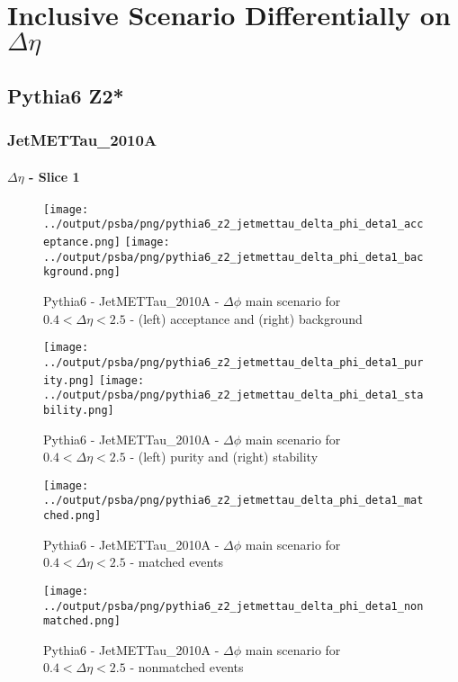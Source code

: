 \documentclass[11pt]{book}
\begin{document}
\clearpage
\chapter{Inclusive Scenario Differentially on $\Delta\eta$}
\section{Pythia6 Z2*}
\subsection{JetMETTau\_2010A}

\subsubsection{$\Delta\eta$ - Slice 1}
\begin{figure}[ht]
\centering
\texttt{[image: ../output/psba/png/pythia6\_z2\_jetmettau\_delta\_phi\_deta1\_acceptance.png]}
\texttt{[image: ../output/psba/png/pythia6\_z2\_jetmettau\_delta\_phi\_deta1\_background.png]}
\caption{Pythia6 - JetMETTau\_2010A - $\Delta\phi$ main scenario for $0.4 < \Delta\eta < 2.5$ - (left) acceptance and (right) background}
\label{fig:p6_jetmettau_delta_phi_deta1_ab}
\end{figure}

\begin{figure}[ht]
\centering
\texttt{[image: ../output/psba/png/pythia6\_z2\_jetmettau\_delta\_phi\_deta1\_purity.png]}
\texttt{[image: ../output/psba/png/pythia6\_z2\_jetmettau\_delta\_phi\_deta1\_stability.png]}
\caption{Pythia6 - JetMETTau\_2010A - $\Delta\phi$ main scenario for $0.4 < \Delta\eta < 2.5$ - (left) purity and (right) stability}
\label{fig:p6_jetmettau_delta_phi_deta1_ps}
\end{figure}

\begin{figure}[ht]
\centering
\texttt{[image: ../output/psba/png/pythia6\_z2\_jetmettau\_delta\_phi\_deta1\_matched.png]}
\caption{Pythia6 - JetMETTau\_2010A - $\Delta\phi$ main scenario for $0.4 < \Delta\eta < 2.5$ - matched events}
\label{fig:p6_jetmettau_delta_phi_deta1_matched}
\end{figure}

\begin{figure}[ht]
\centering
\texttt{[image: ../output/psba/png/pythia6\_z2\_jetmettau\_delta\_phi\_deta1\_nonmatched.png]}
\caption{Pythia6 - JetMETTau\_2010A - $\Delta\phi$ main scenario for $0.4 < \Delta\eta < 2.5$ - nonmatched events}
\label{fig:p6_jetmettau_delta_phi_deta1_nonmatched}
\end{figure}
\end{document}
